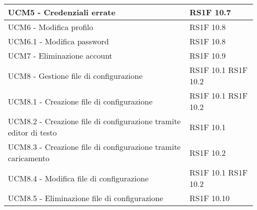 \begin{center}
\begin{longtable}{ | p{5cm} | p{5cm} |}
            UCM5 - Credenziali errate &  RS1F 10.7 \newline  \\ \hline      
            UCM6 - Modifica profilo &  RS1F 10.8 \newline  \\ \hline      
            UCM6.1 - Modifica password &  RS1F 10.8 \newline  \\ \hline      
            UCM7 - Eliminazione account &  RS1F 10.9 \newline  \\ \hline      
            UCM8 - Gestione file di configurazione &  RS1F 10.1 \newline  RS1F 10.2 \newline  \\ \hline      
            UCM8.1 - Creazione file di configurazione &  RS1F 10.1 \newline  RS1F 10.2 \newline  \\ \hline      
            UCM8.2 - Creazione file di configurazione tramite editor di testo &  RS1F 10.1 \newline  \\ \hline      
            UCM8.3 - Creazione file di configurazione tramite caricamento &  RS1F 10.2 \newline  \\ \hline      
            UCM8.4 - Modifica file di configurazione &  RS1F 10.1 \newline  RS1F 10.2 \newline  \\ \hline      
            UCM8.5 - Eliminazione file di configurazione &  RS1F 10.10 \newline  \\ \hline     
      \end{longtable}
      \egroup
      \end{center}  
\clearpage

